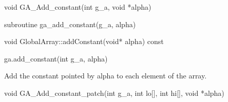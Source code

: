 \documentclass[10pt]{article}
\begin{document}



\begin{capi}
\begin{ccode}
void GA_Add_constant(int g_a, void *alpha)
\end{ccode}
\begin{funcargs}
\end{funcargs}
\end{capi}

\begin{fapi}
\begin{fcode}
subroutine ga_add_constant(g_a,  alpha)
\end{fcode}
\begin{funcargs}
\end{funcargs}
\end{fapi}

\begin{cxxapi}
\begin{cxxcode}
void GlobalArray::addConstant(void* alpha) const
\end{cxxcode}
\begin{funcargs}
\end{funcargs}
\end{cxxapi}

\begin{pyapi}
\begin{pycode}
ga.add_constant(int g_a, alpha)
\end{pycode}
\begin{funcargs}
\end{funcargs}
\end{pyapi}

\gcoll

\begin{desc}
Add the constant pointed by alpha to each element of the array.
\end{desc}



\begin{capi}
\begin{ccode}
void GA_Add_constant_patch(int g_a, int lo[], int hi[], void *alpha)
\end{ccode}
\begin{funcargs}
\end{funcargs}
\end{capi}
\end{document}
